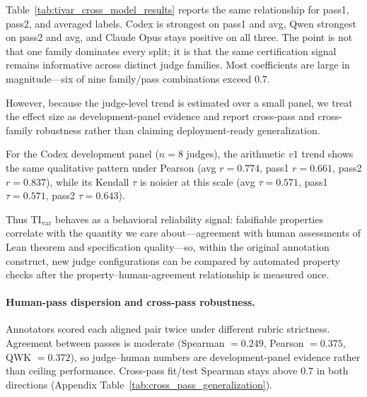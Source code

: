 \documentclass{article}
\begin{document}
Table~\ref{tab:tivar_cross_model_results} reports the same relationship for pass1, pass2, and averaged labels. Codex is strongest on pass1 and avg, Qwen strongest on pass2 and avg, and Claude Opus stays positive on all three. The point is not that one family dominates every split; it is that the same certification signal remains informative across distinct judge families. Most coefficients are large in magnitude---six of nine family/pass combinations exceed \(0.7\).

However, because the judge-level trend is estimated over a small panel, we treat the effect size as development-panel evidence and report cross-pass and cross-family robustness rather than claiming deployment-ready generalization.

For the Codex development panel (\(n=8\) judges), the arithmetic \(v1\) trend shows the same qualitative pattern under Pearson (avg \(r=0.774\), pass1 \(r=0.661\), pass2 \(r=0.837\)), while its Kendall \(\tau\) is noisier at this scale (avg \(\tau=0.571\), pass1 \(\tau=0.571\), pass2 \(\tau=0.643\)).

Thus \(\mathrm{TI}_{\mathrm{var}}\) behaves as a behavioral reliability signal: falsifiable properties correlate with the quantity we care about---agreement with human assessments of Lean theorem and specification quality---so, within the original annotation construct, new judge configurations can be compared by automated property checks after the property--human-agreement relationship is measured once.

\paragraph{Human-pass dispersion and cross-pass robustness.}
Annotators scored each aligned pair twice under different rubric strictness. Agreement between passes is moderate (Spearman \(=0.249\), Pearson \(=0.375\), QWK \(=0.372\)), so judge--human numbers are development-panel evidence rather than ceiling performance. Cross-pass fit/test Spearman stays above \(0.7\) in both directions (Appendix Table~\ref{tab:cross_pass_generalization}).
\end{document}
